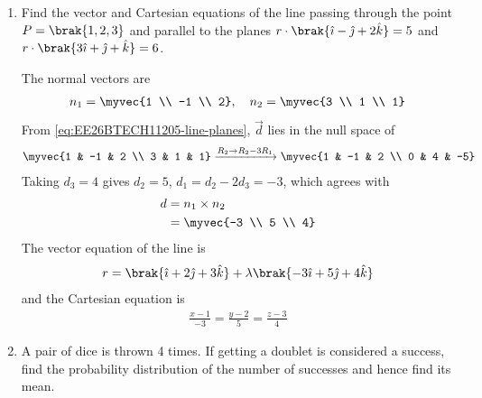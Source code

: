 \begin{enumerate}[label=\thesubsection.\arabic*, ref=\thesubsection.\theenumi, itemsep=3ex]
\item
Find the vector and Cartesian equations of the line passing through the point $\vec{P} = \brak{1,2,3}$ and parallel to the planes $\vec{r}\cdot\brak{\hat{\imath} - \hat{\jmath} + 2\hat{k}} = 5$ and $\vec{r}\cdot\brak{3\hat{\imath} + \hat{\jmath} + \hat{k}} = 6$.

\medskip
\solution The normal vectors are
\begin{align}
	\vec{n}_1 = \myvec{1 \\ -1 \\ 2}, \quad \vec{n}_2 = \myvec{3 \\ 1 \\ 1}
\end{align}
From \eqref{eq:EE26BTECH11205-line-planes}, $\vec{d}$ lies in the null space of
\begin{align}
	\myvec{1 & -1 & 2 \\ 3 & 1 & 1} \xrightarrow{\vec{R}_2 \to \vec{R}_2 - 3\vec{R}_1} \myvec{1 & -1 & 2 \\ 0 & 4 & -5}
\end{align}
Taking $d_3 = 4$ gives $d_2 = 5$, $d_1 = d_2 - 2d_3 = -3$, which agrees with
\begin{align}
	\vec{d} &= \vec{n}_1\times\vec{n}_2 \notag
	\\
	&= \myvec{-3 \\ 5 \\ 4}
\end{align}
The vector equation of the line is
\begin{align}
	\vec{r} = \brak{\hat{\imath} + 2\hat{\jmath} + 3\hat{k}} + \lambda\brak{-3\hat{\imath} + 5\hat{\jmath} + 4\hat{k}}
\end{align}
and the Cartesian equation is
\begin{align}
	\frac{x-1}{-3} = \frac{y-2}{5} = \frac{z-3}{4}
\end{align}

\item
A pair of dice is thrown 4 times. If getting a doublet is considered a success, find the probability distribution of the number of successes and hence find its mean.


\end{enumerate}
